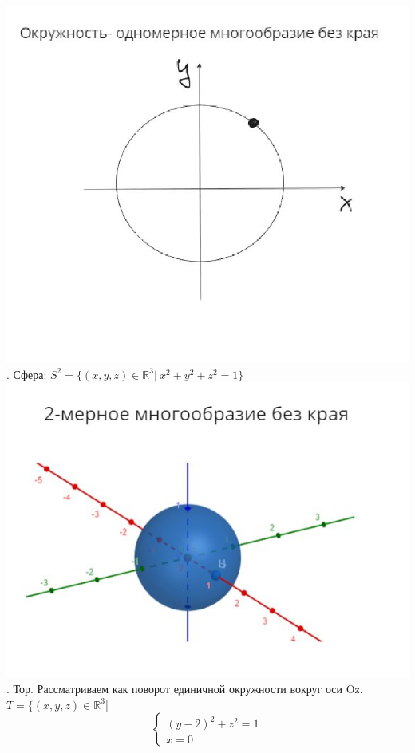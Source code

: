 \documentclass[12pt,a4paper]{article}
\begin{document}
\newline \includegraphics[scale=0.85]{image2.jpg}
. Сфера: \(S^2 = \{(x,y,z)\in\mathbb{R}^3|~ x^2+y^2+z^2=1\}\)
\newline \includegraphics[scale=0.5]{image3.jpg}
. Тор. Рассматриваем как поворот единичной окружности вокруг оси Oz.
\(T=\{(x,y,z)\in \mathbb{R}^3\)|
\begin{equation*}
\begin{cases}
(y - 2)^2 + z^2=1
\\
x =0
\end{cases}
\end{equation*}
\end{document}
